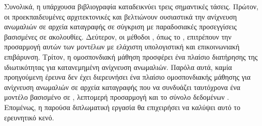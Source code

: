 Συνολικά, η υπάρχουσα βιβλιογραφία καταδεικνύει τρεις σημαντικές τάσεις. Πρώτον, οι προεκπαιδευμένες αρχιτεκτονικές  και  βελτιώνουν ουσιαστικά την ανίχνευση ανωμαλιών σε αρχεία καταγραφής σε σύγκριση με παραδοσιακές προσεγγίσεις βασισμένες σε ακολουθίες. Δεύτερον, οι μέθοδοι , όπως το , επιτρέπουν την προσαρμογή αυτών των μοντέλων με ελάχιστη υπολογιστική και επικοινωνιακή επιβάρυνση. Τρίτον, η ομοσπονδιακή μάθηση προσφέρει ένα πλαίσιο διατήρησης της ιδιωτικότητας για κατανεμημένη ανίχνευση ανωμαλιών. Παρόλα αυτά, καμία προηγούμενη έρευνα δεν έχει διερευνήσει ένα πλαίσιο ομοσπονδιακής μάθησης για ανίχνευση ανωμαλιών σε αρχεία καταγραφής που να συνδυάζει ταυτόχρονα ένα μοντέλο βασισμένο σε , λεπτομερή προσαρμογή  και το σύνολο δεδομένων . Επομένως, η παρούσα διπλωματική εργασία θα επιχειρήσει να καλύψει αυτό το ερευνητικό κενό.
